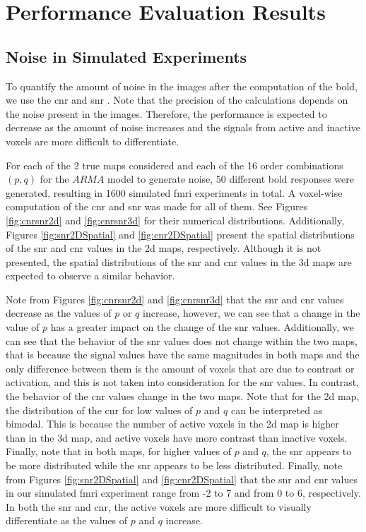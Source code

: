 \chapter{Performance Evaluation Results}

\section{Noise in Simulated Experiments}

To quantify the amount of noise in the images after the computation of the \gls{bold}, we use the
\gls{cnr} and \gls{snr} \cite{welvaert2013definition}. Note that the precision of the calculations 
depends on the noise present in the images. Therefore, the performance is expected to decrease as the 
amount of noise increases and the signals from active and inactive voxels are more difficult to 
differentiate.

For each of the 2 true maps considered and each of the 16 order combinations $(p,q)$ for the 
$ARMA$ model to generate noise, 50 different \gls{bold} responses were generated, resulting in 
1600 simulated \gls{fmri} experiments in total. A voxel-wise computation of the \gls{cnr} and 
\gls{snr} was made for all of them. See Figures \ref{fig:cnrsnr2d} and \ref{fig:cnrsnr3d} for their numerical 
distributions. Additionally, Figures \ref{fig:snr2DSpatial} and \ref{fig:cnr2DSpatial} present the spatial 
distributions of the \gls{snr} and \gls{cnr} values in the \gls{2d} maps, respectively. Although it is not 
presented, the spatial distributions of the \gls{snr} and \gls{cnr} values in the \gls{3d} maps are 
expected to observe a similar behavior.

Note from Figures \ref{fig:cnrsnr2d} and \ref{fig:cnrsnr3d} that the \gls{snr} and \gls{cnr} values 
decrease as the values of $p$ or $q$ increase, however, we can see that a change in the value of $p$ has 
a greater impact on the change of the \gls{snr} values. Additionally, we can see that the behavior of the 
\gls{snr} values does not change within the two maps, that is because the signal values have the same 
magnitudes in both maps and the only difference between them is the amount of voxels that are due to 
contrast or activation, and this is not taken into consideration for the \gls{snr} values. In contrast, the 
behavior of the \gls{cnr} values change in the two maps. Note that for the \gls{2d} map, the distribution 
of the \gls{cnr} for low values of $p$ and $q$ can be interpreted as bimodal. This is because the 
number of active voxels in the \gls{2d} map is higher than in the \gls{3d} map, and 
active voxels have more contrast than inactive voxels. Finally, note that in both maps, 
for higher values of $p$ and $q$, the \gls{snr} appears to be more distributed 
while the \gls{snr} appears to be less distributed. Finally, note from Figures \ref{fig:snr2DSpatial} 
and \ref{fig:cnr2DSpatial} that the \gls{snr} and \gls{cnr} values in our simulated 
\gls{fmri} experiment range from -2 to 7 and from 0 to 6, respectively. In both the 
\gls{snr} and \gls{cnr}, the active voxels are more difficult to visually differentiate as the values 
of $p$ and $q$ increase.

